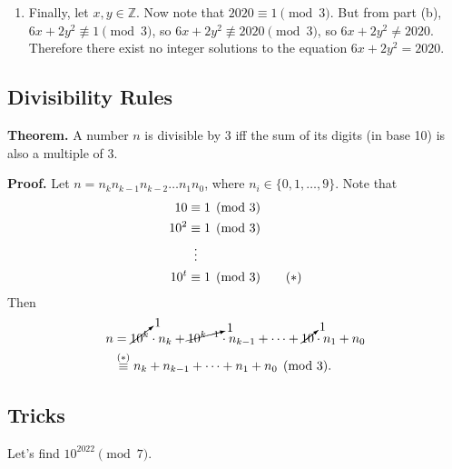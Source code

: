 \documentclass{article}
\begin{document}
\begin{enumerate}[label = \arabic*.]
        In either case, $6x + 2y^2 \equiv 0$ or $2 \pmod{3}$ for all $x \in \mathbb{Z}$.
        \item Finally, let $x, y \in \mathbb{Z}$. Now note that $2020 \equiv 1 \pmod{3}$. But from part (b), $6x + 2y^{2} \not\equiv 1 \pmod{3}$, so $6x + 2y^{2} \not\equiv 2020 \pmod{3}$, so $6x + 2y^{2} \ne 2020$. Therefore there exist no integer solutions to the equation $6x + 2y^{2} = 2020$.
    \end{enumerate}

\subsection*{Divisibility Rules}
    \textbf{Theorem. } A number $n$ is divisible by $3$ iff the sum of its digits (in base 10) is also a multiple of $3$.
    
    \vspace{1.5mm}
    \textbf{Proof. } Let $n = n_{k}n_{k - 1}n_{k - 2}\dots n_{1}n_{0}$, where $n_{i} \in \{0, 1, \dots, 9\}$. Note that 
    \begin{align*}
        10 &\equiv 1 \pmod{3} \\
        10^{2} &\equiv 1 \pmod{3} \\
        &\vdotswithin{ = } \\
        10^{t} &\equiv 1 \pmod{3} \tag{$*$}
    \end{align*}
    Then 
    $$\begin{aligned}[t]
        n &= \cancelto{1}{10^{k}} \cdot n_{k} + \cancelto{1}{10^{k - 1}} \cdot n_{k - 1} + \dots + \cancelto{1}{10} \cdot n_{1} + n_{0} \\
        &\stackrel{(*)}{\equiv} n_{k} + n_{k - 1} + \dots + n_{1} + n_{0} \pmod{3}.
    \end{aligned}$$

\subsection*{Tricks}
    Let's find $10^{2022} \pmod{7}$.
    
\end{document}
